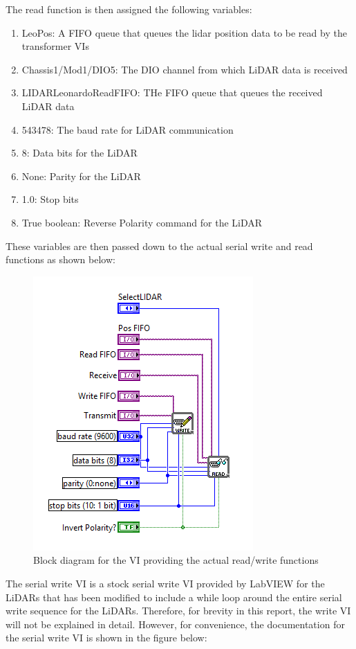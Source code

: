 \noindent The read function is then assigned the following variables:

\begin{enumerate}
\item LeoPos: A FIFO queue that queues the lidar position data to be read by the transformer VIs
\item Chassis1/Mod1/DIO5: The DIO channel from which LiDAR data is received
\item LIDARLeonardoReadFIFO: THe FIFO queue that queues the received LiDAR data
\item 543478: The baud rate for LiDAR communication
\item 8: Data bits for the LiDAR
\item None: Parity for the LiDAR
\item  1.0: Stop bits
\item True boolean: Reverse Polarity command for the LiDAR
\end{enumerate}

\noindent These variables are then passed down to the actual serial write and read functions as shown below:

\newpage

\begin{figure}[h!]
\centering
\includegraphics[scale=0.75]{Photos/readwriteblocks.png}
\caption{Block diagram for the VI providing the actual read/write functions}
\label{fig:readwriteblocks}
\end{figure}

\noindent The serial write VI is a stock serial write VI provided by LabVIEW for the LiDARs that has been modified to include a while loop around the entire serial write sequence for the LiDARs. Therefore, for brevity in this report, the write VI will not be explained in detail. However, for convenience, the documentation for the serial write VI is shown in the figure below:


